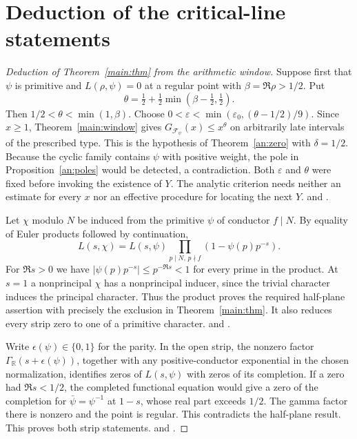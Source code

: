 \section{Deduction of the critical-line statements}\label{main:end}

\begin{proof}[Deduction of Theorem~\ref{main:thm} from the arithmetic window]
Suppose first that \(\psi\) is primitive and \(L(\rho,\psi)=0\) at a regular point with \(\beta=\Re\rho>1/2\). Put
\[
 \theta=\tfrac12+\tfrac12\min(\beta-\tfrac12,\tfrac12).
\]
Then \(1/2<\theta<\min(1,\beta)\). Choose
\(0<\varepsilon<\min(\varepsilon_0,(\theta-1/2)/9)\). Since \(x\ge1\), Theorem~\ref{main:window} gives \(G_{\mathcal F_\psi}(x)\le x^\theta\) on arbitrarily late intervals of the prescribed type. This is the hypothesis of Theorem~\ref{an:zero} with \(\delta=1/2\). Because the cyclic family contains \(\psi\) with positive weight, the pole in Proposition~\ref{an:poles} would be detected, a contradiction. Both \(\varepsilon\) and \(\theta\) were fixed before invoking the existence of \(Y\). The analytic criterion needs neither an estimate for every \(x\) nor an effective procedure for locating the next \(Y\).  and .

Let \(\chi\) modulo \(N\) be induced from the primitive \(\psi\) of conductor \(f\mid N\). By equality of Euler products followed by continuation,
\[
 L(s,\chi)=L(s,\psi)\prod_{p\mid N,\,p\nmid f}(1-\psi(p)p^{-s}).
\]
For \(\Re s>0\) we have \(|\psi(p)p^{-s}|\le p^{-\Re s}<1\) for every prime in the product. At \(s=1\) a nonprincipal \(\chi\) has a nonprincipal inducer, since the trivial character induces the principal character. Thus the product proves the required half-plane assertion with precisely the exclusion in Theorem~\ref{main:thm}. It also reduces every strip zero to one of a primitive character.  and .

Write \(\epsilon(\psi)\in\{0,1\}\) for the parity. In the open strip, the nonzero factor \(\Gamma_{\mathbb R}(s+\epsilon(\psi))\), together with any positive-conductor exponential in the chosen normalization, identifies zeros of \(L(s,\psi)\) with zeros of its completion. If a zero had \(\Re s<1/2\), the completed functional equation would give a zero of the completion for \(\bar\psi=\psi^{-1}\) at \(1-s\), whose real part exceeds \(1/2\). The gamma factor there is nonzero and the point is regular. This contradicts the half-plane result. This proves both strip statements.  and .


\end{proof}
